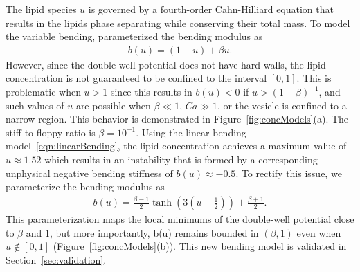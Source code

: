 \documentclass[twoside,twocolumn,9pt]{article}
\begin{document}
The lipid species $u$ is governed by a fourth-order Cahn-Hilliard
equation that results in the lipids phase separating while conserving
their total mass. To model the variable bending,
\citet{soh-tse-li-voi-low2010} parameterized the bending modulus as
\begin{align}
  \label{eqn:linearBending}
  b(u) = (1-u) + \beta u.
\end{align}
However, since the double-well potential does not have hard walls, the
lipid concentration is not guaranteed to be confined to the interval
$[0,1]$. This is problematic when $u > 1$ since this results in $b(u) <
0$ if $u > (1 - \beta)^{-1}$, and such values of $u$ are possible when
$\beta \ll 1$, $Ca \gg 1$, or the vesicle is confined to a narrow
region. This behavior is demonstrated in Figure~\ref{fig:concModels}(a).
The stiff-to-floppy ratio is $\beta = 10^{-1}$. Using the linear bending
model~\eqref{eqn:linearBending}, the lipid concentration achieves a
maximum value of $u \approx 1.52$ which results in an instability that
is formed by a corresponding unphysical negative bending stiffness of
$b(u) \approx -0.5$. To rectify this issue, we parameterize the bending
modulus as
\begin{align}
  b(u) = \frac{\beta-1}{2} \tanh\left(3\left(u-\frac{1}{2} 
    \right)\right) + \frac{\beta + 1}{2}.
  \label{eqn:tanhBending}
\end{align}
This parameterization maps the local minimums of the double-well
potential close to $\beta$ and $1$, but more importantly, b(u) remains
bounded in $(\beta,1)$ even when $u \notin [0,1]$
(Figure~\ref{fig:concModels}(b)). This new bending model is validated in
Section~\ref{sec:validation}.
\end{document}
